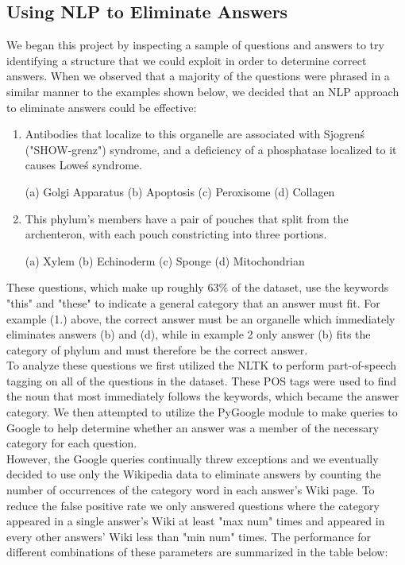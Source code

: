 \documentclass{article}
\theoremstyle{mystuff}
\theoremstyle{myexample}
\theoremstyle{named}
\begin{document}

\subsection{Using NLP to Eliminate Answers}
We began this project by inspecting a sample of questions and answers to try identifying a structure that we could exploit in order to determine correct answers. When we observed that a majority of the questions were phrased in a similar manner to the examples shown below, we decided that an NLP approach to eliminate answers could be effective:

\begin{enumerate}
      \item Antibodies that localize to {\color{red}this} {\color{green}organelle} are associated with Sjogren\'s ("SHOW-grenz") syndrome, and a deficiency of a phosphatase localized to it causes Lowe\'s syndrome.

	(a) {\color{green}Golgi Apparatus} (b) Apoptosis (c) {\color{green}Peroxisome} (d) Collagen

      \item {\color{red}This} {\color{green}phylum's} members have a pair of pouches that split from the archenteron, with each pouch constricting into three portions. 

	(a) Xylem (b) {\color{green}Echinoderm} (c) Sponge (d) Mitochondrian
\end{enumerate} 

These questions, which make up roughly 63$\%$ of the dataset, use the keywords "this" and "these" to indicate a general category that an answer must fit. For example (1.) above, the correct answer must be an organelle which immediately eliminates answers (b) and (d), while in example 2 only answer (b) fits the category of phylum and must therefore be the correct answer. \\

To analyze these questions we first utilized the NLTK to  perform part-of-speech tagging on all of the questions in the dataset. These POS tags were used to find the noun that most immediately follows the keywords, which became the answer category. We then attempted to utilize the PyGoogle module to make queries to Google to help determine whether an answer was a member of the necessary category for each question. \\

However, the Google queries continually threw exceptions and we eventually decided to use only the Wikipedia data to eliminate answers by counting the number of occurrences of the category word in each answer's Wiki page. To reduce the false positive rate we only answered questions where the category appeared in a single answer's Wiki at least "max num" times and appeared in every other answers' Wiki less than "min num" times. The performance for different combinations  of these parameters are summarized in the table below:\\
\end{document}
